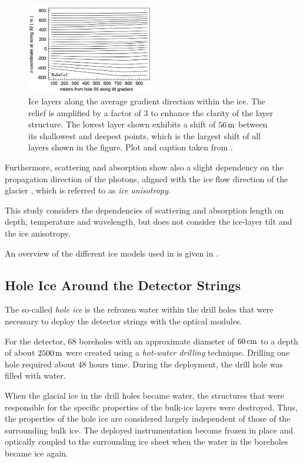 \begin{figure}[htbp]
  \centering
  \includegraphics[width=0.5\textwidth]{img/icepaper-fig-14-layers}
  \caption{Ice layers along the average gradient direction within the ice. The relief is amplified by a factor of 3 to enhance the clarity of the layer structure. The lowest layer shown exhibits a shift of $56\text{\,m}$ between its shallowest and deepest points, which is the largest shift of all layers shown in the figure. Plot and caption taken from \cite[figure 14]{icepaper}.}
  \label{fig:wohr8uaY}
\end{figure}

Furthermore, scattering and absorption show also a slight dependency on
the propagation direction of the photons, aligned with the ice flow
direction of the glacier \cite{icrc17pocam}, which is referred to as
\textit{ice anisotropy}.

This study considers the dependencies of scattering and absorption
length on depth, temperature and wavelength, but does not consider the
ice-layer tilt and the ice anisotropy.

An overview of the different ice models used in \icecube is given in
\cite{flasherdataderivedicemodels}.

\subsection{Hole Ice Around the Detector Strings}
\label{sec:hole_ice}

The so-called \textit{hole ice} is the refrozen water within the drill
holes that were necessary to deploy the detector strings with the
optical modules.

For the \icecube detector, 68 boreholes with an approximate diameter of
\(60\text{\,cm}\) to a depth of about \(2500\text{\,m}\) were created using a
\textit{hot-water drilling} technique. Drilling one hole required about
48 hours time. During the deployment, the drill hole was filled with
water. \cite{instrumentation}

When the glacial ice in the drill holes became water, the structures
that were responsible for the specific properties of the bulk-ice layers
were destroyed. Thus, the properties of the hole ice are considered
largely independent of those of the surrounding bulk ice. The deployed
instrumentation become frozen in place and optically coupled to the
surrounding ice sheet when the water in the boreholes became ice again.
\cite{instrumentation}

